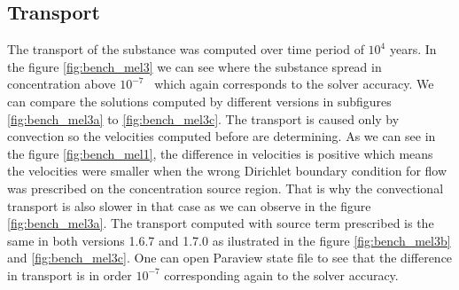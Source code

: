 \subsection{Transport}
The transport of the substance was computed over time period of $10^4$ years. In the figure \ref{fig:bench_mel3} we can see 
where the substance spread in concentration above $10^{-7}$~ which again corresponds to the solver accuracy.
We can compare the solutions computed by different versions in subfigures \ref{fig:bench_mel3a} to \ref{fig:bench_mel3c}.
The transport is caused only by convection so the velocities computed before are determining. As we can see in the figure 
\ref{fig:bench_mel1}, the difference in velocities is positive which means the velocities were smaller when the wrong Dirichlet 
boundary condition for flow was prescribed on the concentration source region. That is why the convectional transport is 
also slower in that case as we can observe in the figure \ref{fig:bench_mel3a}. 
The transport computed with source term prescribed is the same in both versions 1.6.7 and 1.7.0 as ilustrated in the figure
\ref{fig:bench_mel3b} and \ref{fig:bench_mel3c}. One can open Paraview state file to see that the difference in transport is in
order $10^{-7}$ corresponding again to the solver accuracy.

